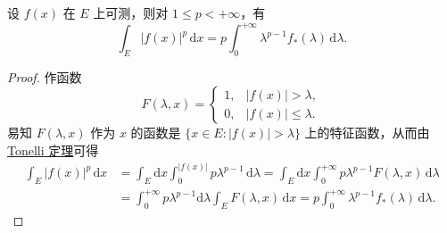 \documentclass[../../main.tex]{subfiles}%
\begin{document}
\begin{theorem}
设 \( f(x) \) 在 \( E \) 上可测，则对 \( 1 \leqslant  p < +\infty \)，有
\[
\int_E |f(x)|^p \, \mathrm{d}x = p \int_0^{+\infty} \lambda^{p - 1} f_*(\lambda) \, \mathrm{d}\lambda. \tag{4.17}
\]
\end{theorem}
\begin{proof}

作函数
\[
F(\lambda, x) = 
\begin{cases} 
1, & |f(x)| > \lambda, \\
0, & |f(x)| \leqslant  \lambda.
\end{cases}
\]
易知 \( F(\lambda, x) \) 作为 \( x \) 的函数是 \( \{ x \in E : |f(x)| > \lambda \} \) 上的特征函数，从而由 \hyperref[theorem:Tonelli 定理 非负可测函数的情形]{Tonelli 定理}可得
\begin{align*}
\int_E |f(x)|^p \, \mathrm{d}x &= \int_E \mathrm{d}x \int_0^{|f(x)|} p\lambda^{p - 1} \, \mathrm{d}\lambda = \int_E \mathrm{d}x \int_0^{+\infty} p\lambda^{p - 1} F(\lambda, x) \, \mathrm{d}\lambda \\
&= \int_0^{+\infty} p\lambda^{p - 1} \mathrm{d}\lambda \int_E F(\lambda, x) \, \mathrm{d}x = p \int_0^{+\infty} \lambda^{p - 1} f_*(\lambda) \, \mathrm{d}\lambda.
\end{align*}

\end{proof}
\end{document}
